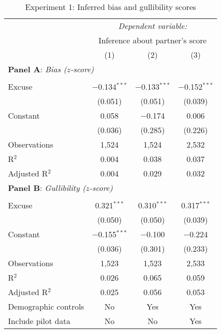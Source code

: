 \begin{table}[!htbp] \centering 
  \caption{Experiment 1: Inferred bias and gullibility scores}
  \label{t:1-score}
\begin{threeparttable}
\begin{tabular}{@{\hspace{5pt}}l@{\hspace{5pt}}ccc} 
\toprule 
 & \multicolumn{3}{c}{\textit{Dependent variable:}} \\ 
\cmidrule(rr){2-4} 
 & \multicolumn{3}{c}{Inference about partner's score} \\ 
 \cmidrule(lr){2-4}
 & (1) & (2) & (3)\\ 
\midrule
\multicolumn{4}{l}{\textbf{Panel A}: \textit{Bias ($z$-score)}} \\
\midrule
\\[-2.1ex] Excuse & $-$0.134$^{***}$ & $-$0.133$^{***}$ & $-$0.152$^{***}$ \\ 
  & (0.051) & (0.051) & (0.039) \\ 
 \addlinespace 
 Constant & 0.058 & $-$0.174 & 0.006 \\ 
  & (0.036) & (0.285) & (0.226) \\ 
 \addlinespace 
\midrule  
Observations & 1,524 & 1,524 & 2,532 \\ 
R$^{2}$ & 0.004 & 0.038 & 0.037 \\ 
Adjusted R$^{2}$ & 0.004 & 0.029 & 0.032 \\ 
\midrule
\multicolumn{4}{l}{\textbf{Panel B}: \textit{Gullibility ($z$-score)}} \\
\midrule
\\[-2.1ex] Excuse & 0.321$^{***}$ & 0.310$^{***}$ & 0.317$^{***}$ \\ 
  & (0.050) & (0.050) & (0.039) \\ 
 \addlinespace 
 Constant & $-$0.155$^{***}$ & $-$0.100 & $-$0.224 \\ 
  & (0.036) & (0.301) & (0.233) \\ 
 \addlinespace 
\midrule  
Observations & 1,523 & 1,523 & 2,533 \\ 
R$^{2}$ & 0.026 & 0.065 & 0.059 \\ 
Adjusted R$^{2}$ & 0.025 & 0.056 & 0.053 \\ 
\midrule
Demographic controls & No & Yes & Yes \\ 
Include pilot data & No & No & Yes\\
\bottomrule 
\end{tabular} 
\begin{tablenotes}

\end{tablenotes}
\end{threeparttable}
\end{table}
